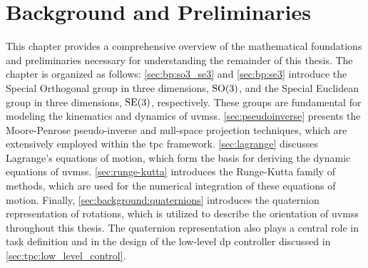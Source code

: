 \chapter{Background and {Preliminaries}}
\label{ch:background}

\iffalse
This chapter provides an overview of the mathematical background and
preliminaries needed to understand the rest of the thesis. The chapter is
structured as follows: \autoref{sec:bp:so3_se3} and \autoref{sec:bp:se3} introduce the
special orthogonal group in three dimensions, $\SO$, and the special Euclidean
group in three dimensions, $\SE$, respectively. These groups are essential for
modeling the kinematics and dynamics of \gls{uvms}s. \autoref{sec:pseudoinverse} introduces the
Moore-Penrose pseudo-inverse and the null-space projection, which are extensively used
in the \gls{tpc} framework. \autoref{sec:lagrange} presents Lagrange's equations of motion, which are used to derive the equations of motion for the \gls{uvms}s. \autoref{sec:runge-kutta} introduces Runge-Kutta methods, which are used to numerically solve the equations of motion. Finally, \autoref{sec:background:quaternions} introduces the quaternion representation of rotations, which is used to represent the orientation of the \gls{uvms}s in this thesis. The quaternion representation is also used
in the definition of tasks and the lower-levl \gls{dp} controller presented in
\autoref{sec:tpc:low_level_control}
The contents of this section, as well as all previous sections
are heavily used in the implementation of the controllers and simulator presented in this thesis.
\fi

This chapter provides a comprehensive overview of the mathematical foundations and preliminaries necessary for understanding the remainder of this thesis. The chapter is organized as follows: \autoref{sec:bp:so3_se3} and \autoref{sec:bp:se3} introduce the Special Orthogonal group in three dimensions, $\SO$, and the Special Euclidean group in three dimensions, $\SE$, respectively. These groups are fundamental for modeling the kinematics and dynamics of \gls{uvms}s.
\autoref{sec:pseudoinverse} presents the Moore-Penrose pseudo-inverse and null-space projection techniques, which are extensively employed within the \gls{tpc} framework. \autoref{sec:lagrange} discusses Lagrange's equations of motion, which form the basis for deriving the dynamic equations of \gls{uvms}s. \autoref{sec:runge-kutta} introduces the Runge-Kutta family of methods, which are used for the numerical integration of these equations of motion.
Finally, \autoref{sec:background:quaternions} introduces the quaternion representation of rotations, which is utilized to describe the orientation of \gls{uvms}s throughout this thesis. The quaternion representation also plays a central role in task definition and in the design of the low-level \gls{dp} controller discussed in \autoref{sec:tpc:low_level_control}.

